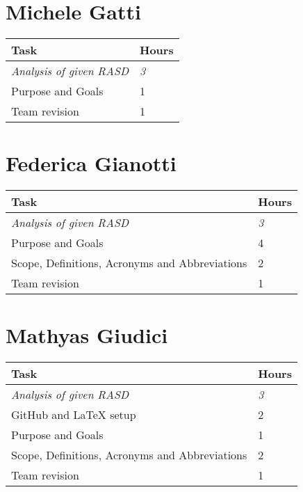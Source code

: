 \section{Michele Gatti}

\:
\begin{center}
\begin{tabular}{ | p{9 cm} | p{3 cm}  |  }
  \hline
    \textbf{Task} & \textbf{Hours }\\ \hline
    \textit{Analysis of given RASD} & \textit{3} \\ \hline
    Purpose and Goals & 1 \\ \hline
    Team revision & 1 \\ \hline
\end{tabular}
\end{center}
\:


\section{Federica Gianotti}

\:
\begin{center}
\begin{tabular}{ | p{9 cm} | p{3 cm}  |  }
  \hline
    \textbf{Task} & \textbf{Hours }\\ \hline
    \textit{Analysis of given RASD} & \textit{3} \\ \hline
    Purpose and Goals & 4 \\ \hline
    Scope, Definitions, Acronyms and Abbreviations & 2 \\ \hline
    Team revision & 1 \\ \hline
\end{tabular}
\end{center}
\:

\section{Mathyas Giudici}

\:
\begin{center}
\begin{tabular}{ | p{9 cm} | p{3 cm}  |  }
  \hline
    \textbf{Task} & \textbf{Hours }\\ \hline
    \textit{Analysis of given RASD} & \textit{3} \\ \hline
    GitHub and LaTeX setup & 2 \\ \hline
    Purpose and Goals & 1 \\ \hline
    Scope, Definitions, Acronyms and Abbreviations & 2 \\ \hline
    Team revision & 1 \\ \hline
\end{tabular}
\end{center}

\clearpage
